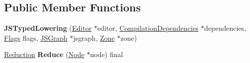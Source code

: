 \subsection*{Public Member Functions}
\begin{DoxyCompactItemize}
\item 
{\bfseries J\+S\+Typed\+Lowering} (\hyperlink{classv8_1_1internal_1_1compiler_1_1_advanced_reducer_1_1_editor}{Editor} $\ast$editor, \hyperlink{classv8_1_1internal_1_1_compilation_dependencies}{Compilation\+Dependencies} $\ast$dependencies, \hyperlink{classv8_1_1base_1_1_flags}{Flags} flags, \hyperlink{classv8_1_1internal_1_1compiler_1_1_j_s_graph}{J\+S\+Graph} $\ast$jsgraph, \hyperlink{classv8_1_1internal_1_1_zone}{Zone} $\ast$zone)\hypertarget{classv8_1_1internal_1_1compiler_1_1_j_s_typed_lowering_a5279198a8f2bc2da1be33db9098edbf1}{}\label{classv8_1_1internal_1_1compiler_1_1_j_s_typed_lowering_a5279198a8f2bc2da1be33db9098edbf1}

\item 
\hyperlink{classv8_1_1internal_1_1compiler_1_1_reduction}{Reduction} {\bfseries Reduce} (\hyperlink{classv8_1_1internal_1_1compiler_1_1_node}{Node} $\ast$node) final\hypertarget{classv8_1_1internal_1_1compiler_1_1_j_s_typed_lowering_afe3ba219125a219bab3e7ae99069630c}{}\label{classv8_1_1internal_1_1compiler_1_1_j_s_typed_lowering_afe3ba219125a219bab3e7ae99069630c}

\end{DoxyCompactItemize}
